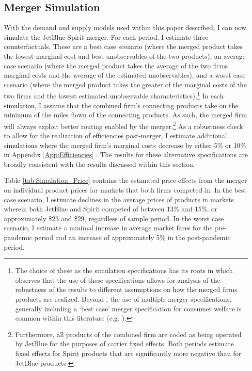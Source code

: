 \documentclass{article}
\begin{document}
	\subsection{Merger Simulation}
	\label{sec:Analysis_Merger}
	With the demand and supply models used within this paper described, I can now simulate the JetBlue-Spirit merger. For each period, I estimate three counterfactuals. These are a best case scenario (where the merged product takes the lowest marginal cost and best unobservables of the two products), an average case scenario (where the merged product takes the average of the two firms marginal costs and the average of the estimated unobservables), and a worst case scenario (where the merged product takes the greater of the marginal costs of the two firms and the lowest estimated unobservable characteristics).\footnote{The choice of these as the simulation specifications has its roots in \citet{ciliberto_market_2021} which observes that the use of these specifications allows for analysis of the robustness of the results to different assumptions on how the merged firms products are realized. Beyond \citet{ciliberto_market_2021}, the use of multiple merger specifications, generally including a `best case' merger specification for consumer welfare is common within this literature (e.g. \citet{li_repositioning_2022}).} In each simulation, I assume that the combined firm's connecting products take on the minimum of the miles flown of the connecting products. As such, the merged firm will always exploit better routing enabled by the merger.\footnote{Furthermore, all products of the combined firm are coded as being operated by JetBlue for the purposes of carrier fixed effects. Both periods estimate fixed effects for Spirit products that are significantly more negative than for JetBlue products.} As a robustness check to allow for the realization of efficiencies post-merger, I estimate additional simulations where the merged firm's marginal costs decrease by either 5\% or 10\% in Appendix \ref{App:Efficiencies} . The results for these alternative specifications are broadly consistent with the results discussed within this section.

     
	Table \ref{tab:Simulation_Price} contains the estimated price effects from the merger on individual product prices for markets that both firms competed in. In the best case scenario, I estimate declines in the average prices of products in markets wherein both JetBlue and Spirit competed of between 13\% and 15\%, or approximately \$23 and \$29, regardless of sample period. In the worst case scenario, I estimate a minimal increase in average market fares for the pre-pandemic period and an increase of approximately 5\% in the post-pandemic period. 
     
\end{document}
